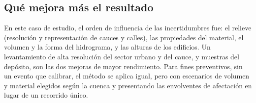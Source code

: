 \subsection*{Qué mejora más el resultado}
En este caso de estudio, el orden de influencia de las incertidumbres fue: el relieve (resolución y representación de cauces y calles), las propiedades del material, el volumen y la forma del hidrograma, y las alturas de los edificios. Un levantamiento de alta resolución del sector urbano y del cauce, y muestras del depósito, son las dos mejoras de mayor rendimiento. Para fines preventivos, sin un evento que calibrar, el método se aplica igual, pero con escenarios de volumen y material elegidos según la cuenca y presentando las envolventes de afectación en lugar de un recorrido único.
